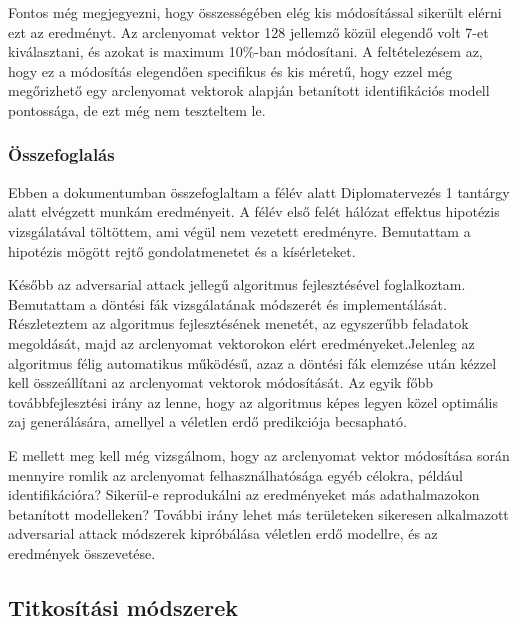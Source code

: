 Fontos még megjegyezni, hogy összességében elég kis módosítással sikerült elérni ezt az eredményt. Az arclenyomat vektor 128 jellemző közül elegendő volt 7-et kiválasztani, és azokat is maximum 10\%-ban módosítani. A feltételezésem az, hogy ez a módosítás elegendően specifikus és kis méretű, hogy ezzel még megőrizhető egy arclenyomat vektorok alapján betanított identifikációs modell pontossága, de ezt még nem teszteltem le.

\subsubsection*{Összefoglalás}

Ebben a dokumentumban összefoglaltam a félév alatt Diplomatervezés 1 tantárgy alatt elvégzett munkám eredményeit. A félév első felét hálózat effektus hipotézis vizsgálatával töltöttem, ami végül nem vezetett eredményre. Bemutattam a hipotézis mögött rejtő gondolatmenetet és a kísérleteket.

Később az adversarial attack jellegű algoritmus fejlesztésével foglalkoztam. Bemutattam a döntési fák vizsgálatának módszerét és implementálását. Részleteztem az algoritmus fejlesztésének menetét, az egyszerűbb feladatok megoldását, majd az arclenyomat vektorokon elért eredményeket.Jelenleg az algoritmus félig automatikus működésű, azaz a döntési fák elemzése után kézzel kell összeállítani az arclenyomat vektorok módosítását. Az egyik főbb továbbfejlesztési irány az lenne, hogy az algoritmus képes legyen közel optimális zaj generálására, amellyel a véletlen erdő predikciója becsapható. 

E mellett meg kell még vizsgálnom, hogy az arclenyomat vektor módosítása során mennyire romlik az arclenyomat felhasználhatósága egyéb célokra, például identifikációra? Sikerül-e reprodukálni az eredményeket más adathalmazokon betanított modelleken? További irány lehet más területeken sikeresen alkalmazott adversarial attack módszerek kipróbálása véletlen erdő modellre, és az eredmények összevetése.

\subsection{Titkosítási módszerek}


